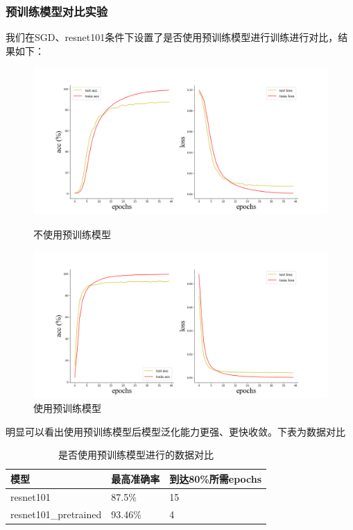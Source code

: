 \documentclass[10.5pt,a4paper]{article}%
\begin{document}
        \subsubsection{预训练模型对比实验}
            我们在SGD、resnet101条件下设置了是否使用预训练模型进行训练进行对比，结果如下：
            \begin{figure}[H]%
            	\centering
            	\begin{minipage}{0.48\textwidth}
            		\centering
            		\includegraphics[width=\textwidth]{resnet101.png}
            		\caption{不使用预训练模型}
            	\end{minipage}
            	\hspace{0cm}%
            	\hfill%
            	\begin{minipage}{0.48\textwidth}
            		\centering
            		\includegraphics[width=\textwidth]{resnet101_pretrained.png}
            		\caption{使用预训练模型}
            	\end{minipage}
            \end{figure}
            明显可以看出使用预训练模型后模型泛化能力更强、更快收敛。下表为数据对比
            \begin{table}[!ht]
            \centering
            \begin{tabular}{|l|l|l|}
            \hline
                模型 & 最高准确率 & 到达80\%所需epochs \\ \hline
                resnet101 & 87.5\% & 15 \\ \hline
                resnet101\_pretrained & 93.46\% & 4 \\ \hline
            \end{tabular}
            \caption{是否使用预训练模型进行的数据对比}
            \end{table}
\end{document}
